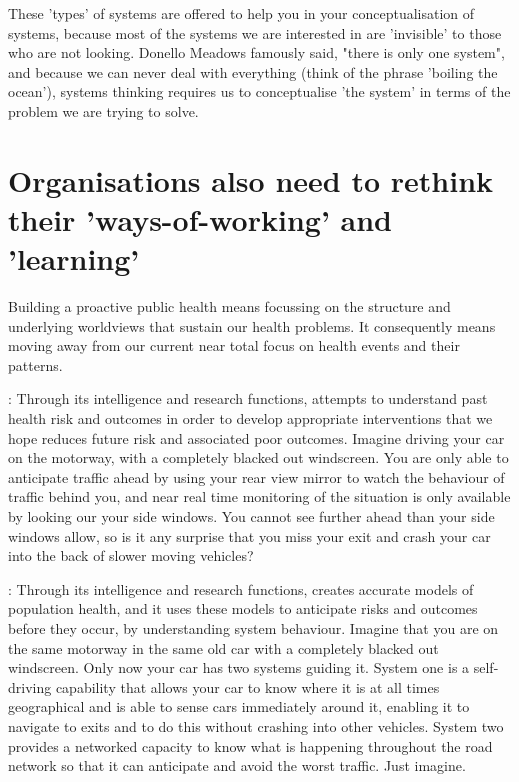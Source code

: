 These 'types' of systems are offered to help you in your conceptualisation of systems, because most of the systems we are interested in are 'invisible' to those who are not looking. Donello Meadows famously said, "there is only one system", and because we can never deal with everything (think of the phrase 'boiling the ocean'), systems thinking requires us to conceptualise 'the system' in terms of the problem we are trying to solve.

\section{Organisations also need to rethink their 'ways-of-working' and 'learning'}

Building a proactive public health means focussing on the structure and underlying worldviews that sustain our health problems. It consequently means moving away from our current near total focus on health events and their patterns.

: Through its intelligence and research functions, attempts to understand past health risk and outcomes in order to develop appropriate interventions that we hope reduces future risk and associated poor outcomes. Imagine driving your car on the motorway, with a completely blacked out windscreen. You are only able to anticipate traffic ahead by using your rear view mirror to watch the behaviour of traffic behind you, and near real time monitoring of the situation is only available by looking our your side windows. You cannot see further ahead than your side windows allow, so is it any surprise that you miss your exit and crash your car into the back of slower moving vehicles?

: Through its intelligence and research functions, creates accurate models of population health, and it uses these models to anticipate risks and outcomes before they occur, by understanding system behaviour. Imagine that you are on the same motorway in the same old car with a completely blacked out windscreen. Only now your car has two systems guiding it. System one is a self-driving capability that allows your car to know where it is at all times geographical and is able to sense cars immediately around it, enabling it to navigate to exits and to do this without crashing into other vehicles. System two provides a networked capacity to know what is happening throughout the road network so that it can anticipate and avoid the worst traffic. Just imagine.

